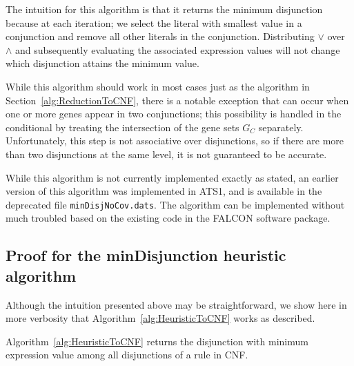 The intuition for this algorithm is that it returns the minimum
disjunction because at each iteration; we select the literal with
smallest value in a conjunction and remove all other literals in the
conjunction. Distributing $\lor$ over $\land$ and subsequently
evaluating the associated expression values will not change which
disjunction attains the minimum value.

While this algorithm should work in most cases just as the algorithm
in \suppOrApp Section~\ref{alg:ReductionToCNF}, there is a notable exception that
can occur when one or more genes appear in two conjunctions; this
possibility is handled in the conditional by treating the intersection
of the gene sets $G_C$ separately. Unfortunately, this step is not
associative over disjunctions, so if there are more than two
disjunctions at the same level, it is not guaranteed to be accurate.

While this algorithm is not currently implemented exactly as stated, 
an earlier version of this algorithm was implemented in ATS1, and
is available in the deprecated file \texttt{minDisjNoCov.dats}.
The algorithm can be implemented without much troubled based on the
existing code in the FALCON software package.

\subsection{Proof for the minDisjunction heuristic algorithm}

Although the intuition presented above may be straightforward, we show
here in more verbosity that Algorithm~\ref{alg:HeuristicToCNF} works
as described.

\begin{Theorem}
\label{thm:HeuristicToCNF}
Algorithm~\ref{alg:HeuristicToCNF} returns the disjunction with
minimum expression value among all disjunctions of a rule in CNF.
\end{Theorem}

